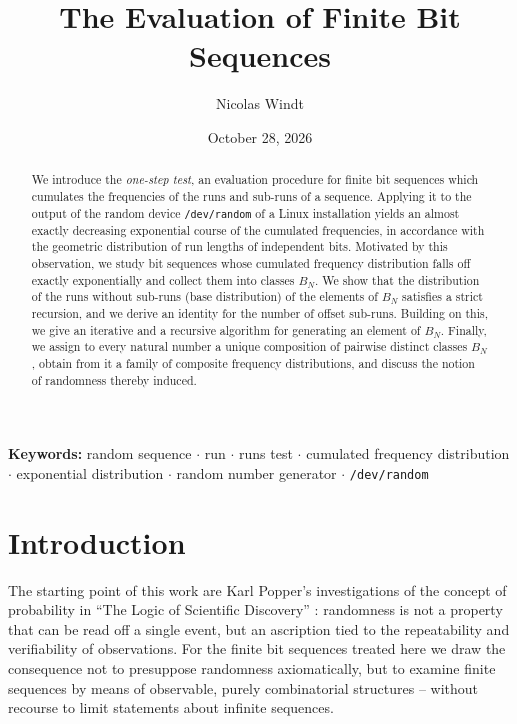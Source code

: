 \documentclass[11pt,a4paper]{scrartcl}
\title{The Evaluation of Finite Bit Sequences}
\author{Nicolas Windt}
\date{October 28, 2026}
\theoremstyle{plain}
\theoremstyle{definition}
\theoremstyle{remark}
\begin{document}
\maketitle

\begin{abstract}
We introduce the \emph{one-step test}, an evaluation procedure for
finite bit sequences which cumulates the frequencies of the runs and
sub-runs of a sequence. Applying it to the output of the random device
\texttt{/dev/random} of a Linux installation yields an almost exactly
decreasing exponential course of the cumulated frequencies, in
accordance with the geometric distribution of run lengths of
independent bits. Motivated by this observation, we study bit
sequences whose cumulated frequency distribution falls off exactly
exponentially and collect them into classes $B_N$. We show that the
distribution of the runs without sub-runs (base distribution) of the
elements of $B_N$ satisfies a strict recursion, and we derive an
identity for the number of offset sub-runs. Building on this, we give
an iterative and a recursive algorithm for generating an element of
$B_N$. Finally, we assign to every natural number a unique
composition of pairwise distinct classes $B_N$, obtain from it a
family of composite frequency distributions, and discuss the notion of
randomness thereby induced.
\end{abstract}

\vspace{0.5em}
\noindent\textbf{Keywords:}
random sequence $\cdot$ run $\cdot$ runs test $\cdot$ cumulated
frequency distribution $\cdot$ exponential distribution $\cdot$
random number generator $\cdot$ \texttt{/dev/random}

\section{Introduction}\label{sec:einleitung}

The starting point of this work are Karl Popper's investigations of
the concept of probability in \enquote{The Logic of Scientific
Discovery} \cite{popper1935}: randomness is not a property that can be
read off a single event, but an ascription tied to the repeatability
and verifiability of observations. For the finite bit sequences
treated here we draw the consequence not to presuppose randomness
axiomatically, but to examine finite sequences by means of
observable, purely combinatorial structures -- without recourse to
limit statements about infinite sequences.
\end{document}
